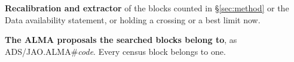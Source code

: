 \begin{table}
\centering
\scriptsize
\setlength{\tabcolsep}{3pt}
\caption{\textbf{Recalibration and extractor} of the blocks counted in
\S\ref{sec:method} or the Data availability statement, or holding a
crossing or a best limit now.}
\label{tab:recalrecon}

\end{table}

\begin{table}
\centering
\scriptsize
\caption{\textbf{The \NProjCodes{} ALMA proposals the searched blocks belong
to}, as \mbox{ADS/JAO.ALMA\#\textit{code}}. Every census block belongs to
one.\ProjCodeUnresClause}
\label{tab:projcodes}

\end{table}
